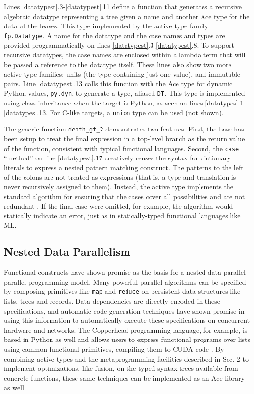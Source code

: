 \documentclass[9pt,preprint]{sigplanconf}
\begin{document}
Lines \ref{datatypest}.3-\ref{datatypest}.11 define a function that generates a recursive algebraic datatype representing a tree given a name and another Ace type for the data at the leaves. This type implemented by the active type family \verb|fp.Datatype|. A name for the datatype and the case names and types are provided programmatically on lines \ref{datatypest}.3-\ref{datatypest}.8. To support recursive datatypes, the case names are enclosed within a lambda term that will be passed a reference to the datatype itself. These lines also show two more active type families: units (the type containing just one value), and immutable pairs. Line \ref{datatypest}.13 calls this function with the Ace type for dynamic Python values, \verb|py.dyn|, to generate a type, aliased \verb|DT|. This type is implemented using class inheritance when the target is Python, as seen on lines \ref{datatypes}.1-\ref{datatypes}.13. For C-like targets, a \verb|union| type can be used (not shown).

The generic function \verb|depth_gt_2| demonstrates two features. First, the base has been setup to treat the final expression in a top-level branch as the return value of the function, consistent with typical functional languages. Second, the \verb|case| ``method'' on line \ref{datatypest}.17 creatively reuses the syntax for dictionary literals to express a nested pattern matching construct. The patterns to the left of the colons are not treated as expressions (that is, a type and translation is never recursively assigned to them). Instead, the active type implements the standard algorithm for ensuring that the cases cover all possibilities and are not redundant \cite{pfpl}. If the final case were omitted, for example, the algorithm would statically indicate an error, just as in statically-typed functional languages like ML.

\subsection{Nested Data Parallelism}
Functional constructs have shown promise as the basis for a nested data-parallel parallel programming model. Many powerful parallel algorithms can be specified by composing primitives like \verb|map| and \verb|reduce| on persistent data structures like lists, trees and records. Data dependencies are directly encoded in these specifications, and automatic code generation techniques have shown promise in using this information to automatically execute these specifications on concurrent hardware and networks. The Copperhead programming language, for example, is based in Python as well and allows users to express functional programs over lists using common functional primitives, compiling them to CUDA code \cite{catanzaro2011copperhead}. By combining active types and the metaprogramming facilities described in Sec. 2 to implement optimizations, like fusion, on the typed syntax trees available from concrete functions, these same techniques can be implemented as an Ace library as well.
\end{document}
